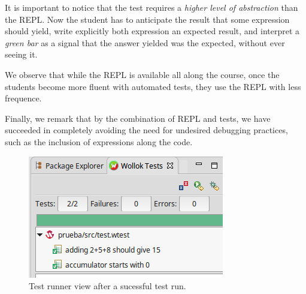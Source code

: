 It is important to notice that the test requires a \emph{higher level of abstraction} than the REPL.
Now the student has to anticipate the result that some expression should yield, write explicitly both expression an expected result, and interpret a \emph{green bar} as a signal that the answer yielded was the expected, without ever seeing it.

We observe that while the REPL is available all along the course, once the students become more fluent with automated tests, they use the REPL with less frequence.

Finally, we remark that by the combination of REPL and tests, we have succeeded in completely avoiding the need for undesired debugging practices, such as the inclusion of  expressions along the code.

\begin{figure}[ht]

    \centering
	\includegraphics[scale=0.6]{images/testRunner.png}
    \caption{Test runner view after a sucessful test run.}
    \label{fig:testRunner.png}
\end{figure}


